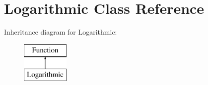 \hypertarget{class_logarithmic}{\section{\-Logarithmic \-Class \-Reference}
\label{class_logarithmic}
}
\-Inheritance diagram for \-Logarithmic\-:\begin{figure}[H]
\begin{center}
\leavevmode
\includegraphics[height=2.000000cm]{class_logarithmic}
\end{center}
\end{figure}
